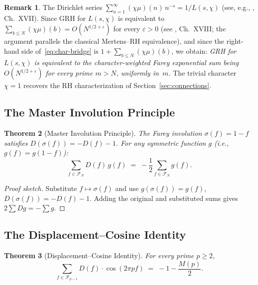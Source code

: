 \documentclass[11pt]{article}
\newtheorem{theorem}{Theorem}[section]
\theoremstyle{definition}
\newtheorem{remark}[theorem]{Remark}
\newcommand{\F}{\mathcal{F}}
\begin{document}
\begin{remark}\label{rem:grh}
The Dirichlet series $\sum_{n=1}^{\infty} (\chi\mu)(n)\,n^{-s}
= 1/L(s,\chi)$ (see, e.g., \cite{HardyWright2008}, Ch.~XVII).
Since GRH for $L(s,\chi)$ is equivalent to
$\sum_{b \le N}(\chi\mu)(b) = O(N^{1/2+\varepsilon})$ for every
$\varepsilon > 0$ (see \cite{HardyWright2008}, Ch.~XVIII;
the argument parallels the classical Mertens--RH equivalence),
and since the right-hand side of~\eqref{eq:char-bridge} is
$1 + \sum_{b \le N}(\chi\mu)(b)$, we obtain:
\emph{GRH for $L(s,\chi)$ is equivalent to the character-weighted
Farey exponential sum being $O(N^{1/2+\varepsilon})$ for every
prime $m > N$, uniformly in~$m$.}
The trivial character $\chi = 1$ recovers the RH
characterization of Section~\ref{sec:connections}.
\end{remark}

\subsection{The Master Involution Principle}

\begin{theorem}[Master Involution Principle]\label{thm:involution}
The Farey involution $\sigma(f) = 1 - f$ satisfies
$D(\sigma(f)) = -D(f) - 1$.  For any symmetric function $g$
(i.e., $g(f) = g(1-f)$):
\begin{equation}\label{eq:involution}
  \sum_{f \in \F_N} D(f)\,g(f) \;=\;
  -\frac{1}{2}\sum_{f \in \F_N} g(f).
\end{equation}
\end{theorem}

\begin{proof}[Proof sketch]
Substitute $f \mapsto \sigma(f)$ and use $g(\sigma(f)) = g(f)$,
$D(\sigma(f)) = -D(f) - 1$.  Adding the original and substituted
sums gives $2\sum Dg = -\sum g$.
\end{proof}

\subsection{The Displacement--Cosine Identity}

\begin{theorem}[Displacement--Cosine Identity]\label{thm:disp-cos}
For every prime $p \ge 2$,
\begin{equation}\label{eq:disp-cos}
  \sum_{f \in \F_{p-1}} D(f) \cdot \cos(2\pi p f)
  \;=\; -1 - \frac{M(p)}{2}.
\end{equation}
\end{theorem}
\end{document}
